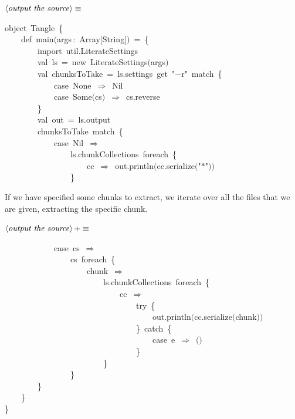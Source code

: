 \documentclass[a4paper,12pt]{article}
\begin{document}
$\left<\mbox{\emph{output the source}}\right>\equiv$
\begin{program}{\vem object}~Tangle~{\small\{}
\\~~~~{\vem def}~main$($args\,{\rm :}~Array$[$String$]$$)$~=~{\small\{}
\\~~~~~~~~{\vem import}~util.LiterateSettings
\\[0.5em]~~~~~~~~{\vem val}~ls~=~{\vem new}~LiterateSettings$($args$)$
\\[0.5em]~~~~~~~~{\vem val}~chunksToTake~=~ls.settings~get~"$-$r"~{\vem match}~{\small\{}
\\~~~~~~~~~~~~{\vem case}~None~$\Rightarrow$~Nil
\\~~~~~~~~~~~~{\vem case}~Some$($cs$)$~$\Rightarrow$~cs.reverse
\\~~~~~~~~{\small\}}
\\[0.5em]~~~~~~~~{\vem val}~out~=~ls.output
\\[0.5em]~~~~~~~~chunksToTake~{\vem match}~{\small\{}
\\~~~~~~~~~~~~{\vem case}~Nil~$\Rightarrow$
\\~~~~~~~~~~~~~~~~ls.chunkCollections~foreach~{\small\{}
\\~~~~~~~~~~~~~~~~~~~~cc~$\Rightarrow$~out.println$($cc.serialize$($"$*$"$)$$)$
\\~~~~~~~~~~~~~~~~{\small\}}
\\[0.5em]\end{program}



If we have specified some chunks to extract, we iterate over all the files
that we are given, extracting the specific chunk.

$\left<\mbox{\emph{output the source}}\right>+\equiv$
\begin{program}~~~~~~~~~~~~{\vem case}~cs~$\Rightarrow$
\\~~~~~~~~~~~~~~~~cs~foreach~{\small\{}
\\~~~~~~~~~~~~~~~~~~~~chunk~$\Rightarrow$
\\~~~~~~~~~~~~~~~~~~~~~~~~ls.chunkCollections~foreach~{\small\{}
\\~~~~~~~~~~~~~~~~~~~~~~~~~~~~cc~$\Rightarrow$
\\~~~~~~~~~~~~~~~~~~~~~~~~~~~~~~~~{\vem try}~{\small\{}
\\~~~~~~~~~~~~~~~~~~~~~~~~~~~~~~~~~~~~out.println$($cc.serialize$($chunk$)$$)$
\\~~~~~~~~~~~~~~~~~~~~~~~~~~~~~~~~{\small\}}~{\vem catch}~{\small\{}
\\~~~~~~~~~~~~~~~~~~~~~~~~~~~~~~~~~~~~{\vem case}~e~$\Rightarrow$~$($$)$
\\~~~~~~~~~~~~~~~~~~~~~~~~~~~~~~~~{\small\}}
\\~~~~~~~~~~~~~~~~~~~~~~~~{\small\}}
\\~~~~~~~~~~~~~~~~{\small\}}
\\~~~~~~~~{\small\}}
\\~~~~{\small\}}
\\{\small\}}
\end{program}
\end{document}
